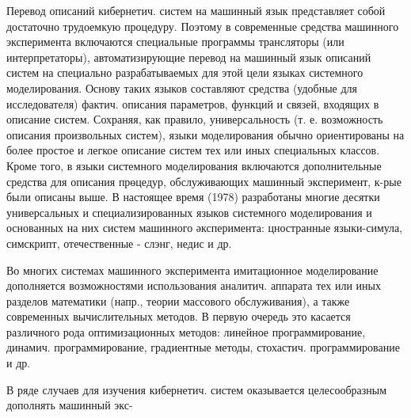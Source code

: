 \documentclass[10pt]{article}
\begin{document}
Перевод описаний кибернетич. систем на машинный язык представляет собой достаточно трудоемкую процедуру. Поэтому в современные средства машинного эксперимента включаются специальные программы трансляторы (или интерпретаторы), автоматизирующие перевод на машинный язык описаний систем на специально разрабатываемых для этой цели языках системного моделирования. Основу таких языков составляют средства (удобные для исследователя) фактич. описания параметров, функций и связей, входящих в описание систем. Сохраняя, как правило, универсальность (т. е. возможность описания произвольных систем), языки моделирования обычно ориентированы на более простое и легкое описание систем тех или иных специальных классов. Кроме того, в языки системного моделирования включаются дополнительные средства для описания прөцедур, обслуживающих машинный эксперимент, к-рые были описаны выше. В настоящее время (1978) разработаны многие десятки универсальных и специализированных языков системного моделирования и основанных на них систем машинного әксперимента: цностранные языки-симула, симскрипт, отечественные - слэнг, недис и др.



Во многих системах машинного эксперимента имитационное моделирование дополняется возможностями использования аналитич. аппарата тех или иных разделов математики (напр., теории массового обслуживания), а также современных вычислительных методов. В первую очередь это касается различного рода оптимизационных методов: линейное программирование, динамич. программирование, градиентные методы, стохастич. программирование и др.



В ряде случаев для изучения кибернетич. систем оказывается целесообразным дополнять машинный экс-
\end{document}
